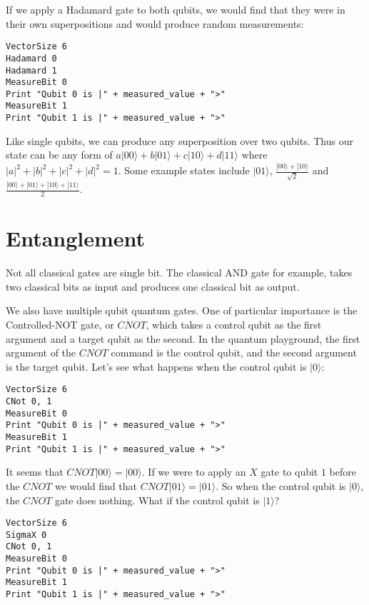 \documentclass[twocolumn]{article}
\begin{document}
If we apply a Hadamard gate to both qubits, we would find that they were in their own superpositions and would produce random measurements:

\begin{lstlisting}
VectorSize 6
Hadamard 0
Hadamard 1
MeasureBit 0
Print "Qubit 0 is |" + measured_value + ">"
MeasureBit 1
Print "Qubit 1 is |" + measured_value + ">"
\end{lstlisting}

Like single qubits, we can produce any superposition over two qubits. Thus our state can be any form of $a|00\rangle + b|01\rangle + c|10\rangle + d|11\rangle$ where $|a|^2 + |b|^2 + |c|^2 + |d|^2 = 1$. Some example states include $|01\rangle$, $\frac{|00\rangle + |10\rangle}{\sqrt{2}}$ and $\frac{|00\rangle + |01\rangle + |10\rangle + |11\rangle}{2}$.

\section{Entanglement}
\label{sec:entanglement}

Not all classical gates are single bit. The classical AND gate for example, takes two classical bits as input and produces one classical bit as output.

We also have multiple qubit quantum gates. One of particular importance is the Controlled-NOT gate, or $CNOT$, which takes a control qubit as the first argument and a target qubit as the second. In the quantum playground, the first argument of the $CNOT$ command is the control qubit, and the second argument is the target qubit. Let's see what happens when the control qubit is $|0\rangle$:

\begin{lstlisting}
VectorSize 6
CNot 0, 1
MeasureBit 0
Print "Qubit 0 is |" + measured_value + ">"
MeasureBit 1
Print "Qubit 1 is |" + measured_value + ">"
\end{lstlisting}

It seems that $CNOT|00\rangle = |00\rangle$. If we were to apply an $X$ gate to qubit $1$ before the $CNOT$ we would find that $CNOT|01\rangle = |01\rangle$. So when the control qubit is $|0\rangle$, the $CNOT$ gate does nothing. What if the control qubit is $|1\rangle$?

\begin{lstlisting}
VectorSize 6
SigmaX 0
CNot 0, 1
MeasureBit 0
Print "Qubit 0 is |" + measured_value + ">"
MeasureBit 1
Print "Qubit 1 is |" + measured_value + ">"
\end{lstlisting}
\end{document}
